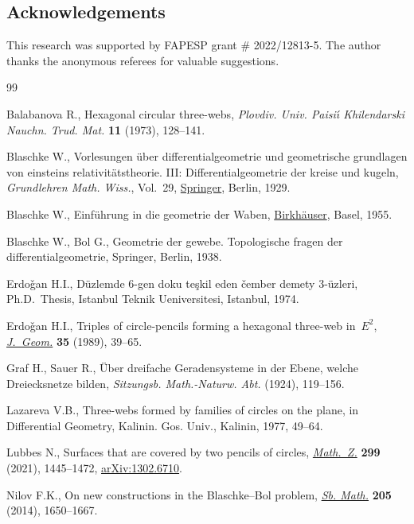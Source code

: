 \documentclass[pdftex]{sigma}
\numberwithin{equation}{section}
\begin{document}
\subsection*{Acknowledgements}
This research was supported by FAPESP grant \# 2022/12813-5.
The author thanks the anonymous referees for valuable suggestions.

\begin{thebibliography}{99}
\footnotesize\itemsep=0pt

Balabanova R., Hexagonal circular three-webs, \textit{Plovdiv. Univ.
 Paisi\'{\i} Khilendarski Nauchn. Trud. Mat.} \textbf{11} (1973), 128--141.

Blaschke W., Vorlesungen \"uber differentialgeometrie und geometrische
 grundlagen von einsteins relativit\"atstheorie. {III}: {D}ifferentialgeometrie
 der kreise und kugeln, \textit{Grundlehren Math. Wiss.}, Vol.~29,
 \href{https://doi.org/10.1007/978-3-642-50823-3}{Springer}, Berlin, 1929.

Blaschke W., Einf\"uhrung in die geometrie der {W}aben,
 \href{https://doi.org/10.1007/978-3-0348-6952-2}{Birkh\"{a}user}, Basel,
 1955.

Blaschke W., Bol G., Geometrie der gewebe. {T}opologische fragen der
 differentialgeometrie, Springer, Berlin, 1938.

Erdo\v{g}an H.I., D\"uzlemde $6$-gen doku te\c{s}kil eden \v{c}ember demety
 $3$-\"uzleri, Ph.D.~Thesis, {I}stanbul Teknik Ueniversitesi, Istanbul, 1974.

Erdo\v{g}an H.I., Triples of circle-pencils forming a hexagonal three-web
 in~{$E^2$}, \href{https://doi.org/10.1007/BF01222261}{\textit{J.~Geom.}}
 \textbf{35} (1989), 39--65.

Graf H., Sauer R., \"Uber dreifache Geradensysteme in der Ebene, welche
 Dreiecksnetze bilden, \textit{Sitzungsb. Math.-Naturw. Abt.} (1924),
 119--156.

Lazareva V.B., Three-webs formed by families of circles on the plane, in
 Differential {G}eometry, Kalinin. Gos. Univ., Kalinin, 1977, 49--64.

Lubbes N., Surfaces that are covered by two pencils of circles,
 \href{https://doi.org/10.1007/s00209-021-02713-x}{\textit{Math.~Z.}}
 \textbf{299} (2021), 1445--1472,
 \href{http://arxiv.org/abs/1302.6710}{arXiv:1302.6710}.

Nilov F.K., On new constructions in the {B}laschke--{B}ol problem,
 \href{https://doi.org/10.1070/SM2014v205n11ABEH004432}{\textit{Sb. Math.}}
 \textbf{205} (2014), 1650--1667.


\end{thebibliography}
\end{document}
